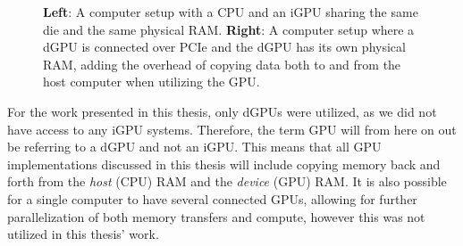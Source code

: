 \begin{figure}[H]\label{figure:igpu-and-dgpu-system}
\begin{center}
\hspace{4.5em}
\caption{\textbf{Left}: A computer setup with a CPU and an iGPU sharing the same die and the same physical RAM. \textbf{Right}: A computer setup where a dGPU is connected over PCIe and the dGPU has its own physical RAM, adding the overhead of copying data both to and from the host computer when utilizing the GPU.}
\end{center}
\end{figure}

For the work presented in this thesis, only dGPUs were utilized, as we did not have access to any iGPU systems.
Therefore, the term GPU will from here on out be referring to a dGPU and not an iGPU.
This means that all GPU implementations discussed in this thesis will include copying memory back and forth from the \textit{host} (CPU) RAM and the \textit{device} (GPU) RAM.
It is also possible for a single computer to have several connected GPUs, allowing for further parallelization of both memory transfers and compute, however this was not utilized in this thesis' work.
